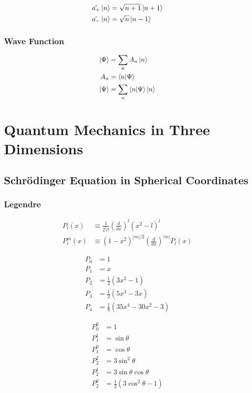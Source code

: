 \documentclass[8pt]{amsart}
\newcommand{\der}[2][]{\frac{d#1}{d#2}}
\begin{document}
\begin{multicols}{3}
\begin{align*}
  \hat{a_{+}}\ket{n}&=\sqrt{n+1}\ket{n+1}\\
  \hat{a_{-}}\ket{n}&=\sqrt{n}\ket{n-1}
\end{align*}

\subsubsection{Wave Function}%
\label{ssub:wave_function}

\begin{align*}
  \ket{\Psi}&=\sum_nA_n\ket{n}\\
  A_n&=\braket{n}{\Psi}\\
  \ket{\Psi}&=\sum_n\braket{n}{\Psi}\ket{n}
\end{align*}


\section{Quantum Mechanics in Three Dimensions}%
\label{sec:quantum_mechanics_in_three_dimensions}

\subsection{Schr\"odinger Equation in Spherical Coordinates}%
\label{sub:schr"odinger_equation_in_spherical_coordinates}

\subsubsection{Legendre}%
\label{ssub:legendre}

\begin{align*}
  P_l(x)&\equiv\frac{1}{2^ll!}\left(\der{x}\right)^l(x^2-l)^l\\
  P_l^m(x)&\equiv(1-x^2)^{|m|/2}\left(\der{x}\right)^{|m|}P_l(x)
\end{align*}

\begin{multicols}{2}
  \begin{align*}
    P_0&=1\\
    P_1&=x\\
    P_2&=\frac{1}{2}(3x^2-1)\\
    P_3&=\frac{1}{2}(5x^3-3x)\\
    P_4&=\frac{1}{8}(35x^4-30x^2-3)
  \end{align*}

  \begin{align*}
    P_0^0&=1\\
    P_1^1&=\sin\theta\\
    P_1^0&=\cos\theta\\
    P_2^2&=3\sin^2\theta\\
    P_2^1&=3\sin\theta\cos\theta\\
    P_2^0&=\frac{1}{2}(3\cos^2\theta-1)
  \end{align*}
\end{multicols}


\end{multicols}
\end{document}
